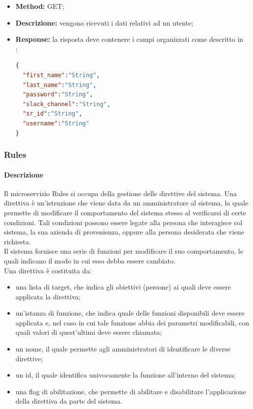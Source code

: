 \begin{itemize}

\begin{itemize}
\item \textbf{Method:} GET;
\item \textbf{Descrizione:} vengono ricevuti i dati relativi ad un utente; 
\item \textbf{Response:} la risposta deve contenere i campi organizzati come descritto in \\:
\begin{lstlisting}[language=json,firstnumber=1]
{
  "first_name":"String",
  "last_name":"String",
  "password":"String",
  "slack_channel":"String",
  "sr_id":"String",
  "username":"String"
}
\end{lstlisting}
\end{itemize}

\end{itemize}

\subsubsection{Rules}
\paragraph{Descrizione}
Il microservizio Rules si occupa della gestione delle direttive del sistema. Una direttiva è un'istruzione che viene data da un amministratore al sistema, la quale permette di modificare il comportamento del sistema stesso al verificarsi di certe condizioni. Tali condizioni possono essere legate alla persona che interagisce col sistema, la sua azienda di provenienza, oppure alla persona desiderata che viene richiesta.\\
Il sistema fornisce una serie di funzioni per modificare il suo comportamento, le quali indicano il modo in cui esso debba essere cambiato. \\
Una direttiva è costituita da:
\begin{itemize}
	\item una lista di target, che indica gli obiettivi (persone) ai quali deve essere applicata la direttiva;
	\item un'istanza di funzione, che indica quale delle funzioni disponibili deve essere applicata e, nel caso in cui tale funzione abbia dei parametri modificabili, con quali valori di quest'ultimi deve essere chiamata;
	\item un nome, il quale permette agli amministratori di identificare le diverse direttive;
	\item un id, il quale identifica univocamente la funzione all'interno del sistema; 
	\item una flag di abilitazione, che permette di abilitare e disabilitare l'applicazione della direttiva da parte del sistema.
\end{itemize}
  

